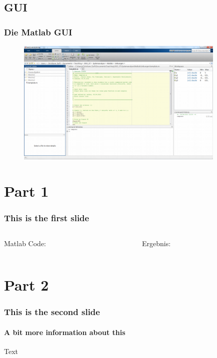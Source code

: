    \subsection{GUI}
    \begin{frame}
        \frametitle{Die Matlab GUI}
        \vspace{-0.8cm}
        \begin{figure}
          \includegraphics[width=10.0cm]{matlab_gui1.png}
        \end{figure}
    \end{frame}




    \section{Part 1}
    \begin{frame}
        \frametitle{This is the first slide}
        \begin{columns}[t]
          \begin{column}{5cm}
            \begin{exampleblock}{Matlab Code:}
              
            \end{exampleblock}
          \end{column}
          \begin{column}{5cm}
            \begin{block}{Ergebnis:}
              
            \end{block}
          \end{column}
        \end{columns}

    \end{frame}

    \section{Part 2}
    \begin{frame}
        \frametitle{This is the second slide}
        \framesubtitle{A bit more information about this}
        Text
    \end{frame}

